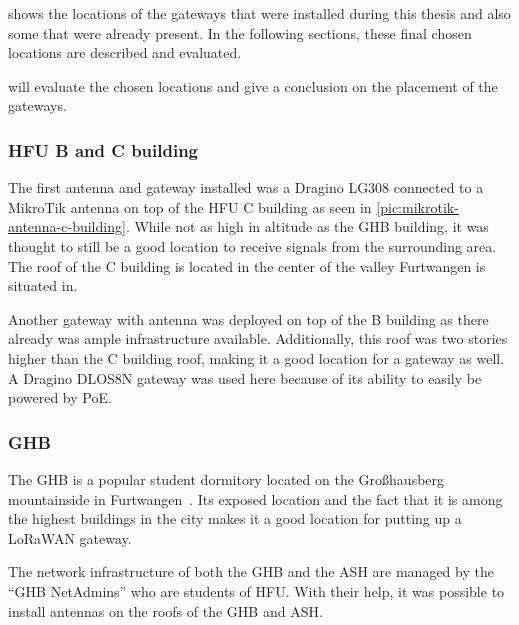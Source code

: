  shows the locations of the gateways that were installed during this thesis and also some that were already present.
In the following sections, these final chosen locations are described and evaluated.

 will evaluate the chosen locations and give a conclusion on the placement of the gateways.

\subsubsection{\ac{HFU} B and C building}

The first antenna and gateway installed was a Dragino LG308 connected to a MikroTik antenna on top of the \ac{HFU} C building as seen in \cref{pic:mikrotik-antenna-c-building}.
While not as high in altitude as the \ac{GHB} building, it was thought to still be a good location to receive signals from the surrounding area.
The roof of the C building is located in the center of the valley Furtwangen is situated in.

Another gateway with antenna was deployed on top of the B building as there already was ample infrastructure available.
Additionally, this roof was two stories higher than the C building roof, making it a good location for a gateway as well.
A Dragino DLOS8N gateway was used here because of its ability to easily be powered by \ac{PoE}.

\subsubsection{\acf{GHB}}

The \ac{GHB} is a popular student dormitory located on the Großhausberg mountainside in Furtwangen~\cite{ghb_netadmins_student_2023}.
Its exposed location and the fact that it is among the highest buildings in the city makes it a good location for putting up a \ac{LoRaWAN} gateway.

The network infrastructure of both the \ac{GHB} and the \ac{ASH} are managed by the ``\ac{GHB} NetAdmins'' who are students of \ac{HFU}.
With their help, it was possible to install antennas on the roofs of the \ac{GHB} and \ac{ASH}.

